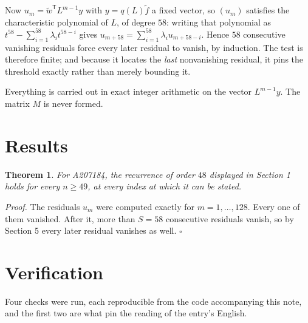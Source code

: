 \documentclass[11pt]{article}
\newtheorem{theorem}{Theorem}
\theoremstyle{definition}
\begin{document}
Now $u_m = \tilde w^{\mathsf T} L^{m-1} y$ with $y = q(L)\tilde f$ a fixed vector, so $(u_m)$ satisfies the characteristic polynomial of $L$, of degree $58$: writing that polynomial as $t^{58} - \sum_{i=1}^{58} \lambda_i t^{58-i}$ gives $u_{m+58} = \sum_{i=1}^{58} \lambda_i u_{m+58-i}$. Hence $58$ consecutive vanishing residuals force every later residual to vanish, by induction. The test is therefore finite; and because it locates the {\itshape last} nonvanishing residual, it pins the threshold exactly rather than merely bounding it.

Everything is carried out in exact integer arithmetic on the vector $L^{m-1}y$. The matrix $M$ is never formed.

\section{Results}

\begin{theorem} For A207184, the recurrence of order $48$ displayed in Section 1 holds for every $n \ge 49$, at every index at which it can be stated.\end{theorem}

{\itshape Proof.} The residuals $u_m$ were computed exactly for $m = 1,\dots,128$. Every one of them vanished. After it, more than $S = 58$ consecutive residuals vanish, so by Section 5 every later residual vanishes as well. $\square$

\section{Verification}

Four checks were run, each reproducible from the code accompanying this note, and the first two are what pin the reading of the entry's English.
\end{document}
